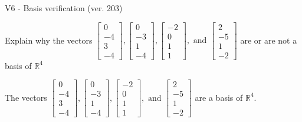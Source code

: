 \begin{exercise}
  \begin{exerciseTitle}V6 - Basis verification (ver. 203)\end{exerciseTitle}
  \begin{exerciseStatement}
    Explain why the vectors \(\left[\begin{array}{r}
0 \\
-4 \\
3 \\
-4
\end{array}\right] , \left[\begin{array}{r}
0 \\
-3 \\
1 \\
-4
\end{array}\right] , \left[\begin{array}{r}
-2 \\
0 \\
1 \\
1
\end{array}\right] , \text{ and } \left[\begin{array}{r}
2 \\
-5 \\
1 \\
-2
\end{array}\right]\) are or are not a basis of \(\mathbb{R}^4\)	


  \end{exerciseStatement}
  \begin{exerciseAnswer}
   The vectors \(\left[\begin{array}{r}
0 \\
-4 \\
3 \\
-4
\end{array}\right] , \left[\begin{array}{r}
0 \\
-3 \\
1 \\
-4
\end{array}\right] , \left[\begin{array}{r}
-2 \\
0 \\
1 \\
1
\end{array}\right] , \text{ and } \left[\begin{array}{r}
2 \\
-5 \\
1 \\
-2
\end{array}\right]\) 
  	 are  a basis of \(\mathbb{R}^4\).
  


  \end{exerciseAnswer}
\end{exercise}